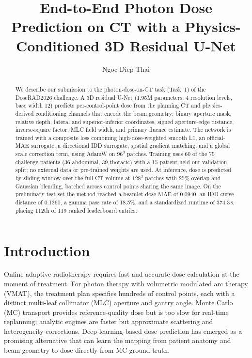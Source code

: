 \documentclass[runningheads]{llncs}
\begin{document}
\title{End-to-End Photon Dose Prediction on CT with a Physics-Conditioned 3D Residual U-Net}

\author{Ngoc Diep Thai}

\maketitle

\begin{abstract}
We describe our submission to the photon-dose-on-CT task (Task~1) of the DoseRAD2026 challenge. A 3D residual U-Net (1.95M parameters, 4 resolution levels, base width 12) predicts per-control-point dose from the planning CT and physics-derived conditioning channels that encode the beam geometry: binary aperture mask, relative depth, lateral and superior-inferior coordinates, signed aperture-edge distance, inverse-square factor, MLC field width, and primary fluence estimate. The network is trained with a composite loss combining high-dose-weighted smooth L1, an official-MAE surrogate, a directional IDD surrogate, spatial gradient matching, and a global scale correction term, using AdamW on $96^3$ patches. Training uses 60 of the 75 challenge patients (36 abdominal, 39 thoracic) with a 15-patient held-out validation split; no external data or pre-trained weights are used. At inference, dose is predicted by sliding-window over the full CT volume at $128^3$ patches with 25\% overlap and Gaussian blending, batched across control points sharing the same image. On the preliminary test set the method reached a beamlet dose MAE of 0.0940, an IDD curve distance of 0.1360, a gamma pass rate of 18.5\%, and a standardized runtime of 374.3\,s, placing 112th of 119 ranked leaderboard entries.
\end{abstract}

\section{Introduction}
Online adaptive radiotherapy requires fast and accurate dose calculation at the moment of treatment. For photon therapy with volumetric modulated arc therapy (VMAT), the treatment plan specifies hundreds of control points, each with a distinct multi-leaf collimator (MLC) aperture and gantry angle. Monte Carlo (MC) transport provides reference-quality dose but is too slow for real-time replanning; analytic engines are faster but approximate scattering and heterogeneity corrections. Deep-learning-based dose prediction has emerged as a promising alternative that can learn the mapping from patient anatomy and beam geometry to dose directly from MC ground truth.
\end{document}
